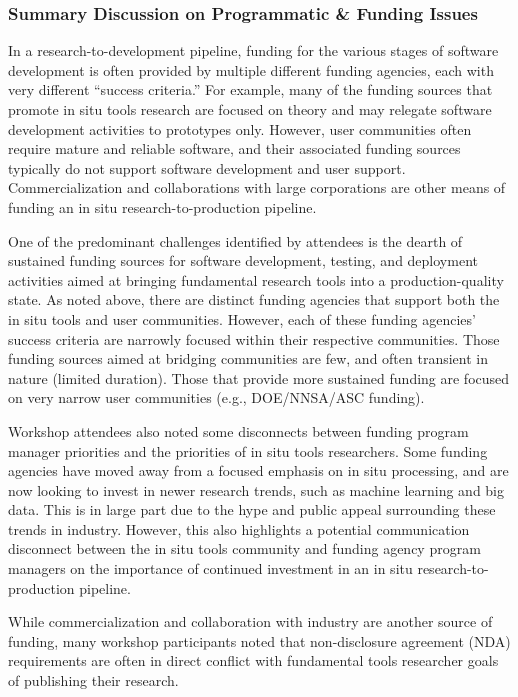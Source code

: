 \subsubsection{Summary Discussion on Programmatic \& Funding Issues}
\label{sec:funding}
\begin{refsection}

 In a research-to-development pipeline, funding for the various stages of software development is often provided by multiple different funding agencies, each with very different ``success criteria.''  For example, many of the funding sources that promote in situ tools research are focused on theory and may relegate software development activities to prototypes only. However, user communities often require mature and reliable software, and their associated funding sources typically do not support software development and user support.  Commercialization and collaborations with large corporations are other means of funding an in situ research-to-production pipeline.

 One of the predominant challenges identified by attendees is the dearth of sustained funding sources for software development, testing, and deployment activities aimed at bringing fundamental research tools into a production-quality state.  As noted above, there are distinct funding agencies that support both the in situ tools and user communities.  However, each of these funding agencies’ success criteria are narrowly focused within their respective communities.  Those funding sources aimed at bridging communities are few, and often transient in nature (limited duration).  Those that provide more sustained funding are focused on very narrow user communities (e.g., DOE/NNSA/ASC funding).  

Workshop attendees also noted some disconnects between funding program manager priorities and  the priorities of in situ tools researchers.  Some funding agencies have moved away from a focused emphasis on in situ processing, and are now looking to invest in newer research trends, such as machine learning and big data.  This is in large part due to the hype and public appeal surrounding these trends in industry.  However, this also highlights a potential communication disconnect between the in situ tools community and funding agency program managers on the importance of continued investment in an in situ research-to-production pipeline.

While commercialization and collaboration with industry are another source of funding, many workshop participants noted that non-disclosure agreement (NDA) requirements are often in direct conflict with fundamental tools researcher goals of publishing their research. 


\end{refsection}
